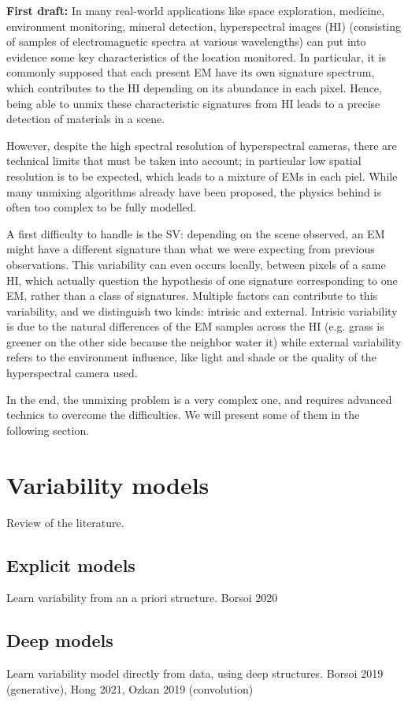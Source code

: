 \documentclass{article}
\begin{document}
\textbf{First draft:} In many real-world applications like space exploration, medicine, environment monitoring, mineral detection, hyperspectral images (HI) (consisting of samples of electromagnetic spectra at various wavelengths) can put into evidence some key characteristics of the location monitored. In particular, it is commonly supposed that each present EM have its own signature spectrum, which contributes to the HI depending on its abundance in each pixel. Hence, being able to unmix these characteristic signatures from HI leads to a precise detection of materials in a scene.

However, despite the high spectral resolution of hyperspectral cameras, there are technical limits that must be taken into account; in particular low spatial resolution is to be expected, which leads to a mixture of EMs in each piel. While many unmixing algorithms already have been proposed, the physics behind is often too complex to be fully modelled.

A first difficulty to handle is the SV: depending on the scene observed, an EM might have a different signature than what we were expecting from previous observations. This variability can even occurs locally, between pixels of a same HI, which actually question the hypothesis of one signature corresponding to one EM, rather than a class of signatures. Multiple factors can contribute to this variability, and we distinguish two kinds: intrisic and external. Intrisic variability is due to the natural differences of the EM samples across the HI (e.g. grass is greener on the other side because the neighbor water it) while external variability refers to the environment influence, like light and shade or the quality of the hyperspectral camera used.

In the end, the unmixing problem is a very complex one, and requires advanced technics to overcome the difficulties. We will present some of them in the following section.

\section{Variability models}
Review of the literature.

\subsection{Explicit models}
Learn variability from an a priori structure. Borsoi 2020

\subsection{Deep models}
Learn variability model directly from data, using deep structures. Borsoi 2019 (generative), Hong 2021, Ozkan 2019 (convolution)
\end{document}
